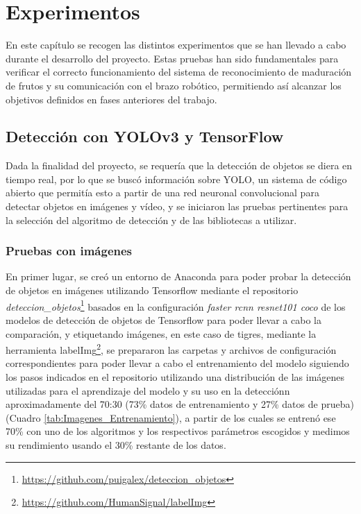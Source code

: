 \chapter{Experimentos}
\label{cap:capitulo6}

En este capítulo se recogen las distintos experimentos que se han llevado a cabo durante el desarrollo del proyecto. Estas pruebas han sido fundamentales para verificar el correcto funcionamiento del sistema de reconocimiento de maduración de frutos y su comunicación con el brazo robótico, permitiendo así alcanzar los objetivos definidos en fases anteriores del trabajo.

\section{Detección con YOLOv3 y TensorFlow}
\label{exp_seleccion_algoritmo}

Dada la finalidad del proyecto, se requería que la detección de objetos se diera en tiempo real, por lo que se buscó información sobre YOLO, un sistema de código abierto que permitía esto a partir de una red neuronal convolucional para detectar objetos en imágenes y vídeo, y se iniciaron las pruebas pertinentes para la selección del algoritmo de detección y de las bibliotecas a utilizar.

\subsection{Pruebas con imágenes}
\label{sec:Pruebas_imgs_TF}

En primer lugar, se creó un entorno de Anaconda para poder probar la detección de objetos en imágenes utilizando Tensorflow mediante el repositorio \textit{deteccion\_objetos}\footnote{\url{https://github.com/puigalex/deteccion_objetos}} basados en la configuración \textit{faster rcnn resnet101 coco} de los modelos de detección de objetos de Tensorflow para poder llevar a cabo la comparación, y etiquetando imágenes, en este caso de tigres, mediante la herramienta labelImg\footnote{\url{https://github.com/HumanSignal/labelImg}}, se prepararon las carpetas y archivos de configuración correspondientes para poder llevar a cabo el entrenamiento del modelo siguiendo los pasos indicados en el repositorio utilizando una distribución de las imágenes utilizadas para el aprendizaje del modelo y su uso en la detecciónn aproximadamente del 70:30 (73\% datos de entrenamiento y 27\% datos de prueba)(Cuadro \ref{tab:Imagenes_Entrenamiento}), a partir de los cuales se entrenó ese 70\% con uno de los algoritmos y los respectivos parámetros escogidos y medimos su rendimiento usando el 30\% restante de los datos.

